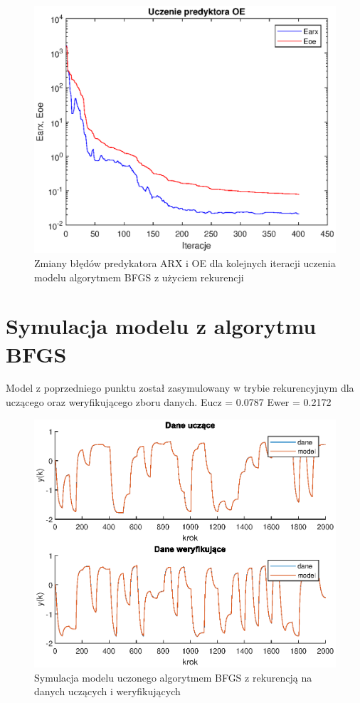		\begin{figure}[h!]
			\centering
			\includegraphics[width=\linewidth]{img/BFGS_OE_p.eps}
			\caption{Zmiany błędów predykatora ARX i OE dla kolejnych iteracji uczenia modelu algorytmem BFGS z użyciem rekurencji}
			\label{fig:bfgs_oe_p}
		\end{figure}
		
		\newpage
	\section{Symulacja modelu z algorytmu BFGS}
		\label{sec:bfgs_sym}
		Model z poprzedniego punktu został zasymulowany w trybie rekurencyjnym dla uczącego oraz weryfikującego zboru danych.
		Eucz = 0.0787
		Ewer = 0.2172
		
		\begin{figure}[h!]
			\centering
			\includegraphics[width=\linewidth]{img/BFGS_OE_d.eps}
			\caption{Symulacja modelu uczonego algorytmem BFGS z rekurencją na danych uczących i weryfikujących}
			\label{fig:bfgs_oe_d}
		\end{figure}
		
